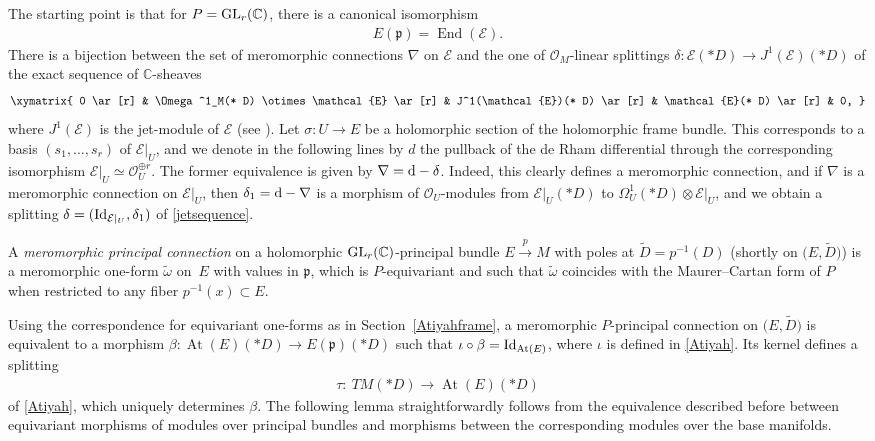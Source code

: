 \documentclass[pdftex]{sigma}
\numberwithin{equation}{section}
\begin{document}
 The starting point is that for $P={\rm GL}_r(\mathbb{C})$, there is a canonical isomorphism \cite[Proposition~9]{Atiyah}
 \begin{gather*}%
 E(\mathfrak{p}) = \operatorname{End}(\mathcal{E}).
 \end{gather*}
There is a bijection between the set of meromorphic connections $\nabla$ on $\mathcal{E}$ and the one of $\mathcal{O}_M$-linear splittings $\delta\colon \mathcal{E}(* D) \longrightarrow J^1(\mathcal{E})(* D)$ of the exact sequence of $\mathbb{C}$-sheaves
 \begin{gather}\label{jetsequence} \xymatrix{ 0 \ar[r] & \Omega^1_M(* D) \otimes \mathcal{E} \ar[r] & J^1(\mathcal{E})(* D) \ar[r] & \mathcal{E}(* D) \ar[r] & 0, }
 \end{gather}
 where $J^1(\mathcal{E})$ is the jet-module of $\mathcal{E}$ (see \cite[p.~193]{Atiyah}). Let $\sigma\colon U \longrightarrow E$ be a holomorphic section of the holomorphic frame bundle. This corresponds to a basis $(s_1,\dots,s_r)$ of $\mathcal{E}\vert_U$, and we denote in the following lines by $d$ the pullback of the de Rham differential through the corresponding isomorphism $\mathcal{E}\vert_U \simeq \mathcal{O}_U^{\oplus r}$. The former equivalence is given by $\nabla = {\rm d} - \delta$. Indeed, this clearly defines a meromorphic connection, and if $\nabla$ is a meromorphic connection on $\mathcal{E}\vert_U$, then $\delta_1 = {\rm d}-\nabla$ is a morphism of $\mathcal{O}_U$-modules from $\mathcal{E}\vert_U(* D)$ to $\Omega^1_U(* D) \otimes \mathcal{E}\vert_U$, and we obtain a splitting $\delta = ({\rm Id}_{\mathcal{E}\vert_U}, \delta_1)$ of \eqref{jetsequence}.

\begin{Definition}\label{principal} A \textit{meromorphic principal connection} on a holomorphic ${\rm GL}_r(\mathbb{C})$-principal bundle $E\overset{p}{\longrightarrow}M$ with poles at $\tilde{D}=p^{-1}(D)$ \big(shortly on $\big(E,\tilde{D}\big)$\big) is a meromorphic one-form $\tilde{\omega}$ on~$E$ with values in $\mathfrak{p}$, which is $P$-equivariant and such that $\tilde{\omega}$ coincides with the Maurer--Cartan form of $P$ when restricted to any fiber $p^{-1}(x) \subset E$. \end{Definition}
 Using the correspondence for equivariant one-forms as in Section~\ref{Atiyahframe}, a meromorphic $P$-principal connection on $\big(E,\tilde{D}\big)$ is equivalent to a morphism $\beta\colon \operatorname{At}(E)(* D) \longrightarrow E(\mathfrak{p})(* D)$ such that $\iota \circ \beta = {\rm Id}_{\operatorname{At}(E)}$, where $\iota$ is defined in \eqref{Atiyah}. Its kernel defines a splitting
\begin{gather}\label{tau}
 \tau\colon\ TM(* D) \longrightarrow \operatorname{At}(E)(* D)
 \end{gather}
 of \eqref{Atiyah}, which uniquely determines $\beta$. The following lemma straightforwardly follows from the equivalence described before between equivariant morphisms of modules over principal bundles and morphisms between the corresponding modules over the base manifolds.
\end{document}
